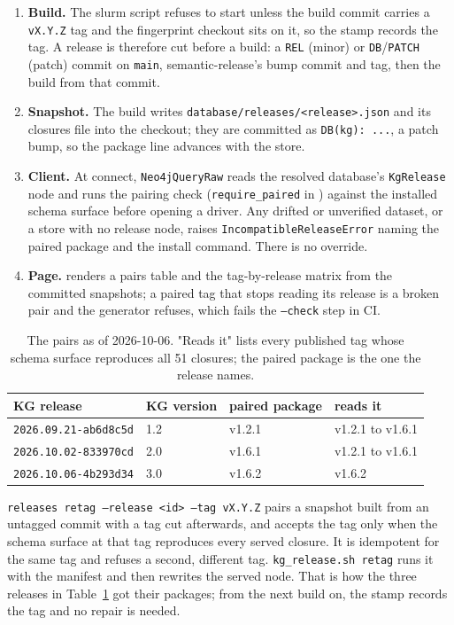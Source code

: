 \begin{enumerate}
\item \textbf{Build.} The slurm script refuses to start unless the build commit
  carries a \texttt{vX.Y.Z} tag and the fingerprint checkout sits on it, so the
  stamp records the tag. A release is therefore cut before a build: a \texttt{REL}
  (minor) or \texttt{DB}/\texttt{PATCH} (patch) commit on \texttt{main},
  semantic-release's bump commit and tag, then the build from that commit.
\item \textbf{Snapshot.} The build writes \texttt{database/releases/<release>.json}
  and its closures file into the checkout; they are committed as
  \texttt{DB(kg): ...}, a patch bump, so the package line advances with the store.
\item \textbf{Client.} At connect, \texttt{Neo4jQueryRaw} reads the resolved
  database's \texttt{KgRelease} node and runs the pairing check
  (\texttt{require\_paired} in )
  against the installed schema surface before opening a driver. Any drifted or
  unverified dataset, or a store with no release node, raises
  \texttt{IncompatibleReleaseError} naming the paired package and the install
  command. There is no override.
\item \textbf{Page.}  renders a pairs table and
  the tag-by-release matrix from the committed snapshots; a paired tag that stops
  reading its release is a broken pair and the generator refuses, which fails the
  \texttt{--check} step in CI.
\end{enumerate}

\begin{table}[htbp]
\centering
\footnotesize
\caption{The pairs as of 2026-10-06. "Reads it" lists every published tag whose
schema surface reproduces all 51 closures; the paired package is the one the
release names.}
\label{tab:pairs}
\begin{tabular}{llll}
\toprule
KG release & KG version & paired package & reads it \\
\midrule
\texttt{2026.09.21-ab6d8c5d} & 1.2 & v1.2.1 & v1.2.1 to v1.6.1 \\
\texttt{2026.10.02-833970cd} & 2.0 & v1.6.1 & v1.2.1 to v1.6.1 \\
\texttt{2026.10.06-4b293d34} & 3.0 & v1.6.2 & v1.6.2 \\
\bottomrule
\end{tabular}
\end{table}

\texttt{releases retag --release <id> --tag vX.Y.Z} pairs a snapshot built from an
untagged commit with a tag cut afterwards, and accepts the tag only when the
schema surface at that tag reproduces every served closure. It is idempotent for
the same tag and refuses a second, different tag. \texttt{kg\_release.sh retag}
runs it with the manifest and then rewrites the served node. That is how the
three releases in Table~\ref{tab:pairs} got their packages; from the next build
on, the stamp records the tag and no repair is needed.
